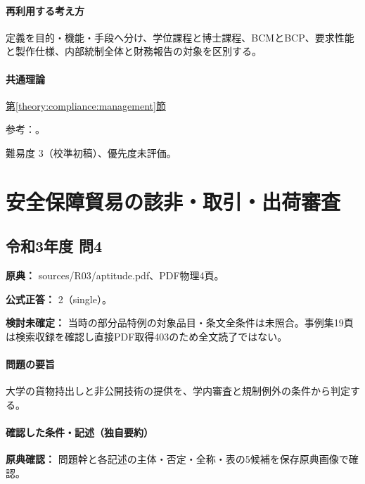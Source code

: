 \paragraph{再利用する考え方} 定義を目的・機能・手段へ分け、学位課程と博士課程、BCMとBCP、要求性能と製作仕様、内部統制全体と財務報告の対象を区別する。

\paragraph{共通理論} \hyperref[theory:compliance:management]{第\ref*{theory:compliance:management}節}

\par 参考：\cite{eng52_professional,eng52_bcp,eng52_performance,eng52_ve,eng52_control}。

\par 難易度 3（校準初稿）、優先度未評価。

\section{安全保障貿易の該非・取引・出荷審査}

\subsection{令和3年度 問4}
\label{q:r03-reg-apt-04}

\noindent\textbf{原典：} sources/R03/aptitude.pdf、PDF物理4頁。

\textbf{公式正答：} 2（single）。

\par\textbf{検討未確定：} 当時の部分品特例の対象品目・条文全条件は未照合。事例集19頁は検索収録を確認し直接PDF取得403のため全文読了ではない。

\paragraph{問題の要旨} 大学の貨物持出しと非公開技術の提供を、学内審査と規制例外の条件から判定する。

\paragraph{確認した条件・記述（独自要約）}\mbox{}\par

\noindent\textbf{原典確認：} 問題幹と各記述の主体・否定・全称・表の5候補を保存原典画像で確認。\par

